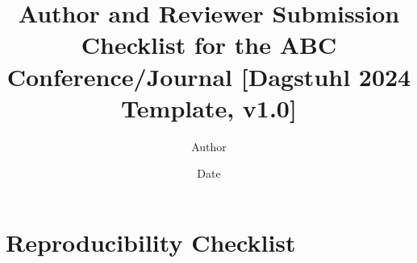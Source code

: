 \documentclass{article}
\title{Author and Reviewer Submission Checklist for the ABC Conference/Journal 
[Dagstuhl 2024 Template, v1.0]}
\author{Author}
\date{Date}
\begin{document}

\newcommand{\answerYes}[1]{{\textcolor{answerYesColor}{[Yes]}\xspace#1}}
\newcommand{\answerNo}[1]{{\textcolor{answerNoColor}{[No]}\xspace#1}}
\newcommand{\answerNA}[1]{{\textcolor{answerNAColor}{[N/A]}\xspace#1}}
\newcommand{\answerTODO}{\textcolor{answerTODOColor}{\textbf{[TODO]}}}


\maketitle


\section{Reproducibility Checklist}
\end{document}
